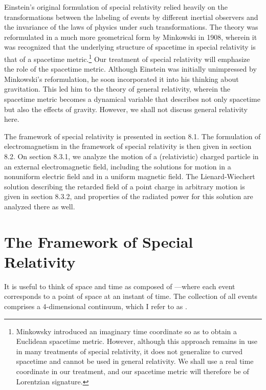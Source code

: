 Einstein's original formulation of special relativity relied heavily on the transformations between the labeling of events by different inertial observers and the invariance of the laws of physics under such transformations. The theory was reformulated in a much more geometrical form by Minkowski in 1908, wherein it was recognized that the underlying structure of spacetime in special relativity is that of a spacetime metric.\footnote{Minkowsky introduced an imaginary time coordinate so as to obtain a Euclidean spacetime metric. However, although this approach remains in use in many treatments of special relativity, it does not generalize to curved spacetime and cannot be used in general relativity. We shall use a real time coordinate in our treatment, and our spacetime metric will therefore be of Lorentzian signature.} Our treatment of special relativity will emphasize the role of the spacetime metric. Although Einstein was initially unimpressed by Minkowski's reformulation, he soon incorporated it into his thinking about gravitation. This led him to the theory of general relativity, wherein the spacetime metric becomes a dynamical variable that describes not only spacetime but also the effects of gravity. However, we shall not discuss general relativity here. 

The framework of special relativity is presented in section 8.1. The formulation of electromagnetism in the framework of special relativity is then given in section 8.2. On section 8.3.1, we analyze the motion of a (relativistic) charged particle in an external electromagnetic field, including the solutions for motion in a nonuniform electric field and in a uniform magnetic field. The Lienard-Wiechert solution describing the retarded field of a point charge in arbitrary motion is given in section 8.3.2, and properties of the radiated power for this solution are analyzed there as well.  

\section{The Framework of Special Relativity}\label{sec:8.1}
It is useful to think of space and time as composed of ---where each event corresponds to a point of space at an instant of time. The collection of all events comprises a 4-dimensional continuum, which I refer to as .

